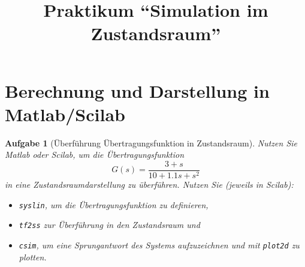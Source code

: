 \documentclass[11pt,a4paper,headsepline]{scrartcl}
\title{Praktikum ``Simulation im Zustandsraum''}
\date{}
\newtheorem{aufgabe}{Aufgabe}
\begin{document}
\maketitle
\thispagestyle{fancy}
\vspace{-2cm}

\section*{Berechnung und Darstellung in Matlab/Scilab}
\begin{aufgabe}[\"Uberf\"uhrung \"Ubertragungsfunktion in Zustandsraum]
\label{Task:Calc}
Nutzen Sie Matlab oder Scilab, um die \"Ubertragungsfunktion \[G(s) = \frac{3+s}{10+1.1s+s^{2}}\]  in eine Zustandsraumdarstellung zu \"uberf\"uhren.
Nutzen Sie (jeweils in Scilab):
\begin{itemize}
	\item \texttt{syslin}, um die \"Ubertragungsfunktion zu definieren,
	\item \texttt{tf2ss} zur \"Uberf\"uhrung in den Zustandsraum und 
	\item \texttt{csim}, um eine Sprungantwort des Systems aufzuzeichnen und mit \texttt{plot2d} zu plotten. 
\end{itemize}
\end{aufgabe}
\vspace{0.5cm}
\end{document}
